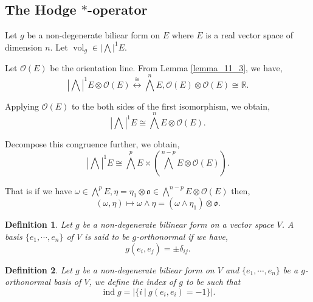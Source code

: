 \documentclass[10pt]{article}
\newtheorem{definition}{Definition}[section]
\DeclareMathOperator{\ind}{ind}
\DeclareMathOperator{\vol}{vol}
\newcommand{\R}[0]{\mathbb{R}}
\newcommand{\sep}[0]{\:|\:}
\begin{document}
\subsection{The Hodge $\ast$-operator}

Let $g$ be a non-degenerate biliear form on $E$ where $E$ is a real vector space of dimension $n$. Let $\vol_g\in\left|\bigwedge\right|^1E$. 
\par Let $\mathcal{O}(E)$ be the orientation line. From Lemma \ref{lemma_11_3}, we have,
\begin{equation*}
    \left\vert\bigwedge\right\vert^1 E\otimes\mathcal{O}(E)\stackrel{\cong}{\longleftrightarrow} \bigwedge^nE, \mathcal{O}(E)\otimes\mathcal{O}(E)\cong\R.
  \end{equation*}

  Applying $\mathcal{O}(E)$ to the both sides of the first isomorphism, we obtain,
  \begin{equation*}
    \left\vert\bigwedge\right\vert^1 E\cong \bigwedge^nE\otimes\mathcal{O}(E).
  \end{equation*}

  Decompose this congruence further, we obtain,
  \begin{equation*}
    \left\vert\bigwedge\right\vert^1 E\cong \bigwedge^pE\times\left(\bigwedge^{n-p}E\otimes\mathcal{O}(E)\right).
  \end{equation*}

  That is if we have $\omega\in\bigwedge^pE,\eta = \eta_1\otimes \mathfrak{o}\in\bigwedge^{n-p}E\otimes\mathcal{O}(E)$ then,
  \begin{equation*}
    (\omega,\eta) \mapsto \omega\wedge\eta = (\omega\wedge\eta_1)\otimes\mathfrak{o}.
  \end{equation*}

\begin{definition}
  Let $g$ be a non-degenerate bilinear form on a vector space $V$. A basis $\{e_1,\cdots,e_n\}$ of $V$ is said to be $g$-orthonormal if we have,
  \begin{equation*}
    g(e_i,e_j) = \pm\delta_{ij}.
  \end{equation*}
\end{definition}

\begin{definition}
  Let $g$ be a non-degenerate biliear form on $V$ and $\{e_1,\cdots,e_n\}$ be a $g$-orthonormal basis of $V$, we define the index of $g$ to be such that 
  \begin{equation*}
    \ind g = \vert\{i\sep g(e_i,e_i) = -1\}\vert.
  \end{equation*}
\end{definition}
\end{document}
